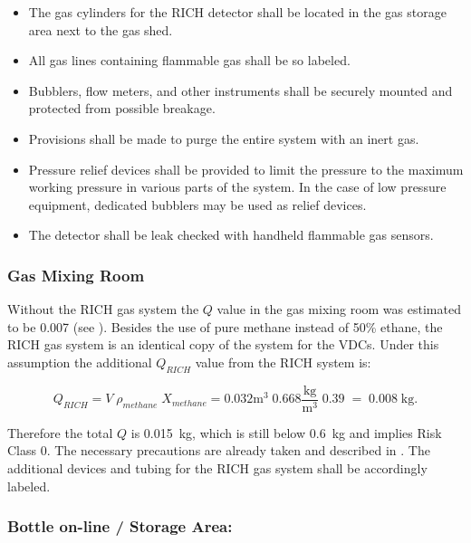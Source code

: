 \begin{safetyen}{0}{0}
\begin{itemize}
\item The gas cylinders for the RICH detector shall be located in the gas storage area
next to the gas shed.  
 
\item All gas lines containing flammable gas shall be so labeled. 
 
\item Bubblers, flow meters, and other instruments shall be securely
mounted and protected from possible breakage. 
 
\item Provisions shall be made to purge the entire system with an inert gas. 
 
\item Pressure relief devices shall be provided to limit the pressure to the maximum
working pressure in various parts of the system. 
In the case of low pressure equipment, dedicated bubblers may be used as relief devices.  
 
\item The detector shall be leak checked with handheld flammable gas sensors. 
 
\end{itemize} 

\subsubsection{Gas Mixing Room}

Without the RICH gas system the $Q$ value in the gas mixing room was estimated
to be 0.007 (see \cite{HazardCalc}). 
Besides the use of pure methane instead of 50\% ethane, 
the RICH gas system is an identical copy of the system for the VDCs.
Under this assumption the  additional $Q_{RICH}$ value from the RICH system is:

\begin{equation} 
Q_{RICH} = V \; \rho_{methane} \; X_{methane} 
= 0.032 \mbox{m}^3 \; 0.668 \frac{\mbox{kg}}{\mbox{m}^3} \; 0.39 \; = \; 0.008 \; \mbox{kg.}
\end{equation} 

Therefore the total $Q$ is 0.015~kg, which is still below 0.6~kg and implies Risk Class 0.
The necessary precautions are already taken and described in \cite{Hawgswww}. The 
additional devices and tubing for the RICH gas system shall be accordingly labeled.

\subsubsection{Bottle on-line / Storage Area:}


\end{safetyen}
